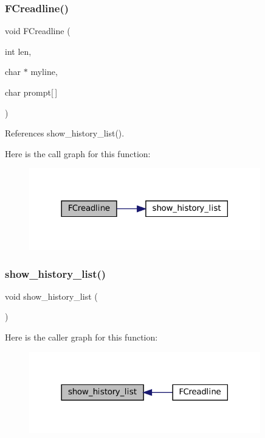 \subsubsection{\texorpdfstring{F\+Creadline()}{FCreadline()}}
{\footnotesize\ttfamily void F\+Creadline (\begin{DoxyParamCaption}\item[{int}]{len,  }\item[{char $\ast$}]{myline,  }\item[{char}]{prompt\mbox{[}$\,$\mbox{]} }\end{DoxyParamCaption})}



References show\+\_\+history\+\_\+list().

Here is the call graph for this function\+:\nopagebreak
\begin{figure}[H]
\begin{center}
\leavevmode
\includegraphics[width=285pt]{C-M__readline_8c_a146edc06a54e833494378446131c6bcd_cgraph}
\end{center}
\end{figure}
\mbox{\label{C-M__readline_8c_a80269900528c2ee04bf7cacb3a07ff40}} 
\subsubsection{\texorpdfstring{show\+\_\+history\+\_\+list()}{show\_history\_list()}}
{\footnotesize\ttfamily void show\+\_\+history\+\_\+list (\begin{DoxyParamCaption}{ }\end{DoxyParamCaption})}

Here is the caller graph for this function\+:\nopagebreak
\begin{figure}[H]
\begin{center}
\leavevmode
\includegraphics[width=285pt]{C-M__readline_8c_a80269900528c2ee04bf7cacb3a07ff40_icgraph}
\end{center}
\end{figure}

